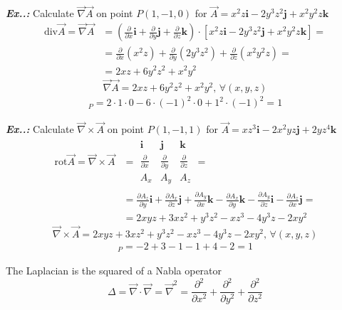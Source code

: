 \documentclass[a4paper]{article}
\begin{document}
\vspace{2ex}\textbf{\textit{Ex.\thesection.\theex: }}Calculate $\vec{\nabla}\vec{A}$ on point $P(1,-1,0)$ for $\vec{A}=x^{2}z\mathbf{i}-2y^{3}z^{2}\mathbf{j}+x^{2}y^{2}z\mathbf{k}$
\begin{align}
\text{div}\vec{A}=\vec{\nabla}\vec{A}&=\left(\frac{\partial}{\partial x}\mathbf{i}+\frac{\partial}{\partial y}\mathbf{j}+\frac{\partial}{\partial z}\mathbf{k}\right)\cdot [x^{2}z\mathbf{i}-2y^{3}z^{2}\mathbf{j}+x^{2}y^{2}z\mathbf{k}]= \\
&=\frac{\partial}{\partial x}(x^{2}z)+\frac{\partial}{\partial y}(2y^{3}z^{2})+\frac{\partial}{\partial z}(x^{2}y^{2}z)= \\
&=2xz+6y^{2}z^{2}+x^{2}y^{2}
\end{align}
$$
\Vec{\nabla}\Vec{A}=2xz+6y^{2}z^{2}+x^{2}y^{2},\,\forall(x,y,z)
$$
\begin{align}
[\vec{\nabla}\vec{A}]_{P}=2\cdot 1\cdot 0-6\cdot (-1)^{2}\cdot 0+1^{2}\cdot (-1)^{2}=\boxed{1}
\end{align}

\vspace{2ex}\textbf{\textit{Ex.\thesection.\theex: }}Calculate $\vec{\nabla}\times \vec{A}$ on point $P(1,-1,1)$ for $\vec{A}=xz^{3}\mathbf{i}-2x^{2}yz\mathbf{j}+2yz^{4}\mathbf{k}$
\begin{align}
\text{rot}\vec{A}=\vec{\nabla}\times \vec{A}&=\begin{array}{|ccc|}
\mathbf{i} & \mathbf{j} & \mathbf{k} \\
\frac{\partial}{\partial x} & \frac{\partial}{\partial y} & \frac{\partial}{\partial z} \\
A_{x} & A_{y} & A_{z}
\end{array}= \\
&=\frac{\partial A_{z}}{\partial y}\mathbf{i}+\frac{\partial A_{x}}{\partial z}\mathbf{j}+\frac{\partial A_{y}}{\partial x}\mathbf{k}-\frac{\partial A_{x}}{\partial y}\mathbf{k}-\frac{\partial A_{y}}{\partial z}\mathbf{i}-\frac{\partial A_{z}}{\partial x}\mathbf{j}= \\
&=2xyz+3xz^2+y^3z^2-xz^3-4y^3z-2xy^2
\end{align}
$$
\Vec{\nabla}\times\Vec{A}=2xyz+3xz^2+y^3z^2-xz^3-4y^3z-2xy^2,\,\forall(x,y,z)
$$
\begin{align}
    [\Vec{\nabla}\times\Vec{A}]_P=-2+3-1-1+4-2=\boxed{1}
\end{align}

The Laplacian is the squared of a Nabla operator
$$
\Delta=\vec{\nabla}\cdot \vec{\nabla}=\vec{\nabla}^{2}=\frac{\partial^{2}}{\partial x^{2}}+\frac{\partial^{2}}{\partial y^{2}}+\frac{\partial^{2}}{\partial z^{2}}
$$
\end{document}
